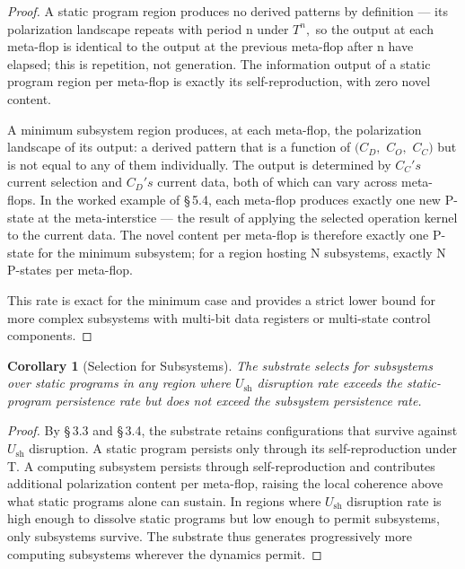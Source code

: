\documentclass[11pt,oneside]{report}
\newtheorem{corollary}[theorem]{Corollary}
\theoremstyle{definition}
\theoremstyle{remark}
\begin{document}
\begin{proof}
A static program region produces no derived patterns by
definition --- its polarization landscape repeats with period n under
\ensuremath{T^{n},} so the output at each meta-flop is identical to the output at
the previous meta-flop after n have elapsed; this is repetition, not
generation. The information output of a static program region per
meta-flop is exactly its self-reproduction, with zero novel content.

A minimum subsystem region produces, at each meta-flop, the polarization
landscape of its output: a derived pattern that is a function of \ensuremath{(C_{D},}
\ensuremath{C_{O},} \ensuremath{C_{C})} but is not equal to any of them individually. The output is
determined by \ensuremath{C_{C}'s} current selection and \ensuremath{C_{D}'s} current data, both of
which can vary across meta-flops. In the worked example of \S\,5.4, each
meta-flop produces exactly one new P-state at the meta-interstice ---
the result of applying the selected operation kernel to the current
data. The novel content per meta-flop is therefore exactly one P-state
for the minimum subsystem; for a region hosting N subsystems, exactly N
P-states per meta-flop.

This rate is exact for the minimum case and provides a strict lower
bound for more complex subsystems with multi-bit data registers or
multi-state control components.

\end{proof}

\begin{corollary}[Selection for Subsystems]
The substrate selects for
subsystems over static programs in any region where \ensuremath{U_{\mathrm{sh}}} disruption rate
exceeds the static-program persistence rate but does not exceed the
subsystem persistence rate.
\end{corollary}

\begin{proof}
By \S\,3.3 and \S\,3.4, the substrate retains configurations that
survive against \ensuremath{U_{\mathrm{sh}}} disruption. A static program persists only through
its self-reproduction under T. A computing subsystem persists through
self-reproduction and contributes additional polarization content per
meta-flop, raising the local coherence above what static programs alone
can sustain. In regions where \ensuremath{U_{\mathrm{sh}}} disruption rate is high enough to
dissolve static programs but low enough to permit subsystems, only
subsystems survive. The substrate thus generates progressively more
computing subsystems wherever the dynamics permit.

\end{proof}
\end{document}
